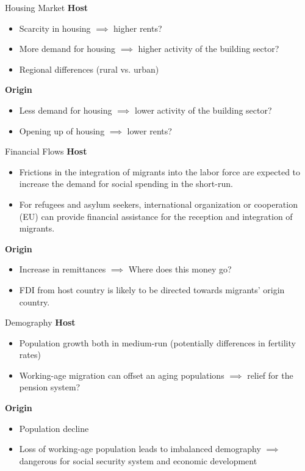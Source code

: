 \documentclass{beamer}
\begin{document}
\begin{frame}{Housing Market}
        \textbf{Host}
\begin{itemize}
    \item Scarcity in housing $\implies$ higher rents?
    \item More demand for housing $\implies$ higher activity of the building sector?
    \item Regional differences (rural vs. urban) %
\end{itemize}
    \textbf{Origin}
    \begin{itemize}
        \item Less demand for housing $\implies$ lower activity of the building sector?
        \item Opening up of housing $\implies$ lower rents?
    \end{itemize}
\end{frame}

\begin{frame}{Financial Flows}
            \textbf{Host}
\begin{itemize}
    \item Frictions in the integration of migrants into the labor force are expected to increase the demand for social spending in the short-run.
    \item For refugees and asylum seekers, international organization or cooperation (EU) can provide financial assistance for the reception and integration of migrants.
\end{itemize}
    \textbf{Origin}
    \begin{itemize}
        \item Increase in remittances $\implies$ Where does this money go?
        \item FDI from host country is likely to be directed towards migrants' origin country. 
    \end{itemize}
\end{frame}

\begin{frame}{Demography}
                \textbf{Host}
\begin{itemize}
    \item Population growth both in medium-run (potentially differences in fertility rates)
    \item Working-age migration can offset an aging populations $\implies$ relief for the pension system?
\end{itemize}
    \textbf{Origin}
    \begin{itemize}
        \item Population decline
        \item Loss of working-age population leads to imbalanced demography $\implies$ dangerous for social security system and economic development
    \end{itemize}
\end{frame}
\end{document}
